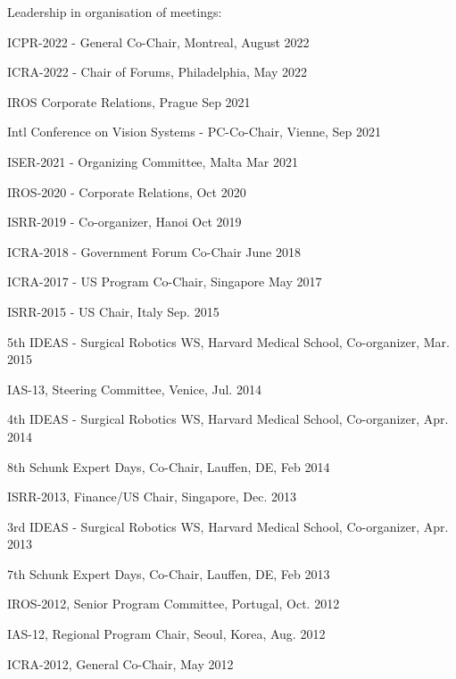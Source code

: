 \documentclass{article}
\begin{document}
\begin{cv}
\begin{cvlist}{Leadership in organisation of meetings:}
\item ICPR-2022 - General Co-Chair, Montreal, \cftdotfill{\cftdotsep}
  August 2022
\item ICRA-2022 - Chair of Forums, Philadelphia, \cftdotfill{\cftdotsep}
  May 2022
\item IROS Corporate Relations, Prague \cftdotfill{\cftdotsep}  Sep 2021
\item Intl Conference on Vision Systems - PC-Co-Chair, Vienne,
  \cftdotfill{\cftdotsep} Sep 2021
\item ISER-2021 - Organizing Committee, Malta \cftdotfill{\cftdotsep}
  Mar 2021
\item IROS-2020 - Corporate Relations, \cftdotfill{\cftdotsep}
  Oct 2020
\item ISRR-2019 - Co-organizer, Hanoi \cftdotfill{\cftdotsep}
  Oct 2019
\item ICRA-2018 - Government Forum Co-Chair \cftdotfill{\cftdotsep}
  June 2018
\item ICRA-2017 - US Program Co-Chair, Singapore
  \cftdotfill{\cftdotsep} May 2017
\item ISRR-2015 - US Chair, Italy \cftdotfill{\cftdotsep} Sep. 2015
\item 5th IDEAS - Surgical Robotics WS, Harvard Medical School,
  Co-organizer, \cftdotfill{\cftdotsep} Mar. 2015
\item IAS-13, Steering Committee, Venice, \cftdotfill{\cftdotsep}
  Jul. 2014
\item 4th IDEAS - Surgical Robotics WS, Harvard Medical School,
  Co-organizer, \cftdotfill{\cftdotsep} Apr. 2014
\item 8th Schunk Expert Days, Co-Chair, Lauffen, DE,
  \cftdotfill{\cftdotsep} Feb 2014
\item ISRR-2013, Finance/US Chair, Singapore, \cftdotfill{\cftdotsep}
  Dec. 2013
\item 3rd IDEAS - Surgical Robotics WS, Harvard Medical School,
  Co-organizer, \cftdotfill{\cftdotsep} Apr. 2013
\item 7th Schunk Expert Days, Co-Chair, Lauffen, DE,
  \cftdotfill{\cftdotsep} Feb 2013
\item IROS-2012, Senior Program Committee,
  Portugal,\cftdotfill{\cftdotsep} Oct. 2012
\item IAS-12, Regional Program Chair, Seoul, Korea,
  \cftdotfill{\cftdotsep} Aug. 2012
\item ICRA-2012, General Co-Chair, \cftdotfill{\cftdotsep} May 2012

\end{cvlist}
\end{cv}
\end{document}
